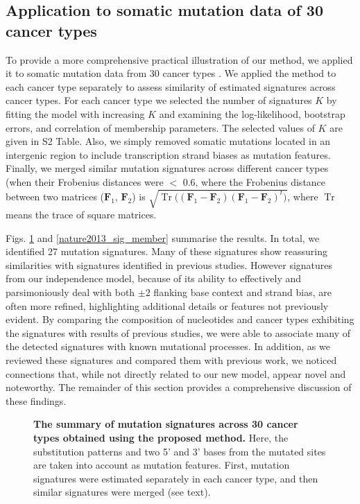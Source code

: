 \documentclass[10pt,letterpaper]{article}
\DeclareMathOperator{\Tr}{Tr}
\begin{document}
\subsection*{Application to somatic mutation data of 30 cancer types}
 
To provide a more comprehensive practical illustration of
our method, we applied it to somatic mutation data from 30 cancer types \cite{pmid23945592}.
We applied the method to each cancer type separately to assess similarity of estimated signatures across cancer types.
For each cancer type we selected the number of signatures $K$ by fitting the model with increasing $K$ and examining the log-likelihood, bootstrap errors, and correlation of membership parameters.
The selected values of $K$ are given in S2 Table.
Also, we simply removed somatic mutations located in an intergenic region to include transcription strand biases as mutation features.
Finally, we merged similar mutation signatures across different cancer types 
(when their Frobenius distances were $<$ $0.6$, where the Frobenius distance between two matrices ($\bm{F}_1$, $\bm{F}_2$) is $\sqrt{ \Tr  \bigl( (\bm{F}_1 -  \bm{F}_2 )  (\bm{F}_1 -  \bm{F}_2 )^t \bigr) }$,
where $\Tr$ means the trace of square matrices.



Figs. \ref{nature2013_sig_summary} and \ref{nature2013_sig_member} summarise the results.
In total, we identified 27 mutation signatures.
Many of these signatures show reassuring similarities with
signatures identified in previous studies. However
signatures from our independence model, because of its ability to effectively
and parsimoniously deal with both $\pm 2$ flanking
base context and strand bias, are often more refined, highlighting additional details or features not previously evident. By comparing the composition of nucleotides and cancer types exhibiting the signatures with results of previous studies, we were able to associate many of the detected signatures with known mutational processes.
In addition, as we reviewed these signatures
and compared them with previous work, we noticed connections
that, while not directly related to our new model, appear
novel and noteworthy. The remainder of this section
provides a comprehensive discussion of these findings.

\begin{figure}[h]
\centering
\caption{{\bf The summary of mutation signatures across 30 cancer types \cite{pmid23945592} obtained using the proposed method.}
Here, the substitution patterns and two 5' and 3' bases from the mutated sites are taken into account as mutation features.
First, mutation signatures were estimated separately in each cancer type, and then similar signatures were merged (see text).
}
\label{nature2013_sig_summary}
\end{figure}
\end{document}

